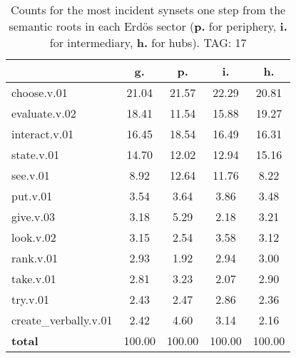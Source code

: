\begin{table}[h!]
\begin{center}
\begin{tabular}{| l || c | c | c | c |}\hline
 & {\bf g.} & {\bf p.} & {\bf i.} & {\bf h.} \\\hline\hline
choose.v.01 & 21.04  & 21.57  & 22.29  & 20.81 \\\hline
evaluate.v.02 & 18.41  & 11.54  & 15.88  & 19.27 \\\hline
interact.v.01 & 16.45  & 18.54  & 16.49  & 16.31 \\\hline
state.v.01 & 14.70  & 12.02  & 12.94  & 15.16 \\\hline
see.v.01 & 8.92  & 12.64  & 11.76  & 8.22 \\\hline
put.v.01 & 3.54  & 3.64  & 3.86  & 3.48 \\\hline
give.v.03 & 3.18  & 5.29  & 2.18  & 3.21 \\\hline
look.v.02 & 3.15  & 2.54  & 3.58  & 3.12 \\\hline
rank.v.01 & 2.93  & 1.92  & 2.94  & 3.00 \\\hline
take.v.01 & 2.81  & 3.23  & 2.07  & 2.90 \\\hline
try.v.01 & 2.43  & 2.47  & 2.86  & 2.36 \\\hline
create\_verbally.v.01 & 2.42  & 4.60  & 3.14  & 2.16 \\\hline\hline
{{\bf total}} & 100.00  & 100.00  & 100.00  & 100.00 \\\hline
\end{tabular}
\caption{Counts for the most incident synsets one step from the semantic roots in each Erd\"os sector ({\bf p.} for periphery, {\bf i.} for intermediary, {\bf h.} for hubs). TAG: 17}
\end{center}
\end{table}